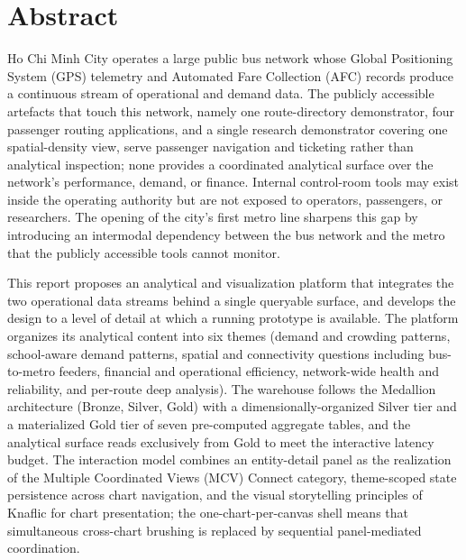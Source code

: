 \chapter*{Abstract}

Ho Chi Minh City operates a large public bus network whose Global Positioning System (GPS) telemetry and Automated Fare Collection (AFC) records produce a continuous stream of operational and demand data. The publicly accessible artefacts that touch this network, namely one route-directory demonstrator, four passenger routing applications, and a single research demonstrator covering one spatial-density view, serve passenger navigation and ticketing rather than analytical inspection; none provides a coordinated analytical surface over the network's performance, demand, or finance. Internal control-room tools may exist inside the operating authority but are not exposed to operators, passengers, or researchers. The opening of the city's first metro line sharpens this gap by introducing an intermodal dependency between the bus network and the metro that the publicly accessible tools cannot monitor.

This report proposes an analytical and visualization platform that integrates the two operational data streams behind a single queryable surface, and develops the design to a level of detail at which a running prototype is available. The platform organizes its analytical content into six themes (demand and crowding patterns, school-aware demand patterns, spatial and connectivity questions including bus-to-metro feeders, financial and operational efficiency, network-wide health and reliability, and per-route deep analysis). The warehouse follows the Medallion architecture (Bronze, Silver, Gold) with a dimensionally-organized Silver tier and a materialized Gold tier of seven pre-computed aggregate tables, and the analytical surface reads exclusively from Gold to meet the interactive latency budget. The interaction model combines an entity-detail panel as the realization of the Multiple Coordinated Views (MCV) Connect category, theme-scoped state persistence across chart navigation, and the visual storytelling principles of Knaflic for chart presentation; the one-chart-per-canvas shell means that simultaneous cross-chart brushing is replaced by sequential panel-mediated coordination.

